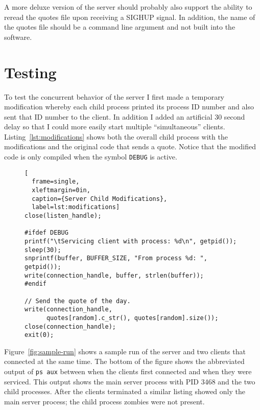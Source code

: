 \documentclass{article}
\newcommand{\command}[1]{\texttt{#1}}
\newcommand{\code}[1]{\texttt{#1}}
\begin{document}
A more deluxe version of the server should probably also support the ability to reread the
quotes file upon receiving a SIGHUP signal. In addition, the name of the quotes file should be a
command line argument and not built into the software.

\section{Testing}
\label{sec:testing}

To test the concurrent behavior of the server I first made a temporary modification whereby each
child process printed its process ID number and also sent that ID number to the client. In
addition I added an artificial 30 second delay so that I could more easily start multiple
``simultaneous'' clients. Listing~\ref{lst:modifications} shows both the overall child process
with the modifications and the original code that sends a quote. Notice that the modified code
is only compiled when the symbol \code{DEBUG} is active.

\begin{figure}[tbhp]
\begin{lstlisting}[
  frame=single,
  xleftmargin=0in,
  caption={Server Child Modifications},
  label=lst:modifications]
close(listen_handle);

#ifdef DEBUG
printf("\tServicing client with process: %d\n", getpid());
sleep(30);
snprintf(buffer, BUFFER_SIZE, "From process %d: ", getpid());
write(connection_handle, buffer, strlen(buffer));
#endif

// Send the quote of the day.
write(connection_handle,
      quotes[random].c_str(), quotes[random].size());
close(connection_handle);
exit(0);
\end{lstlisting}    
\end{figure}

Figure~\ref{fig:sample-run} shows a sample run of the server and two clients that connected at
the same time. The bottom of the figure shows the abbreviated output of \command{ps aux} between
when the clients first connected and when they were serviced. This output shows the main server
process with PID 3468 and the two child processes. After the clients terminated a similar
listing showed only the main server process; the child process zombies were not present.
\end{document}
